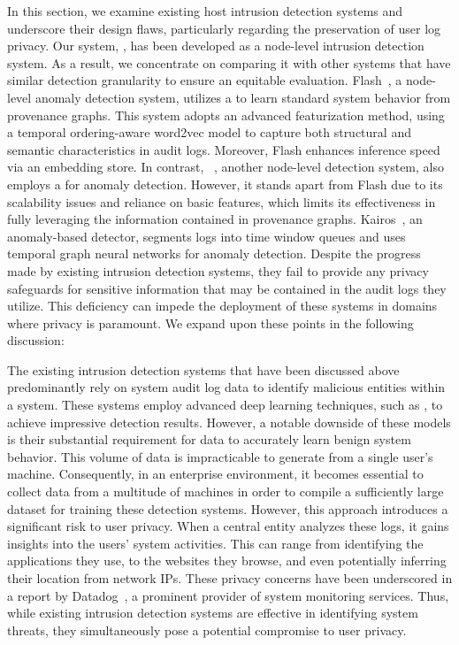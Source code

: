 In this section, we examine existing host intrusion detection systems and underscore their design flaws, particularly regarding the preservation of user log privacy. Our system, \Sys, has been developed as a node-level intrusion detection system. As a result, we concentrate on comparing it with other systems that have similar detection granularity to ensure an equitable evaluation. Flash~\cite{flash2024}, a node-level anomaly detection system, utilizes a \gnn to learn standard system behavior from provenance graphs. This system adopts an advanced featurization method, using a temporal ordering-aware word2vec model to capture both structural and semantic characteristics in audit logs. Moreover, Flash enhances inference speed via an \gnnshort embedding store. In contrast, \threatrace~\cite{wang2022threatrace}, another node-level detection system, also employs a \gnn for anomaly detection. However, it stands apart from Flash due to its scalability issues and reliance on basic features, which limits its effectiveness in fully leveraging the information contained in provenance graphs. Kairos~\cite{cheng2023kairos}, an anomaly-based detector, segments logs into time window queues and uses temporal graph neural networks for anomaly detection. Despite the progress made by existing intrusion detection systems, they fail to provide any privacy safeguards for sensitive information that may be contained in the audit logs they utilize. This deficiency can impede the deployment of these systems in domains where privacy is paramount. We expand upon these points in the following discussion: 

 The existing intrusion detection systems that have been discussed above predominantly rely on system audit log data to identify malicious entities within a system. These systems employ advanced deep learning techniques, such as \gnn, to achieve impressive detection results. However, a notable downside of these models is their substantial requirement for data to accurately learn benign system behavior. This volume of data is impracticable to generate from a single user's machine. Consequently, in an enterprise environment, it becomes essential to collect data from a multitude of machines in order to compile a sufficiently large dataset for training these detection systems. However, this approach introduces a significant risk to user privacy. When a central entity analyzes these logs, it gains insights into the users' system activities. This can range from identifying the applications they use, to the websites they browse, and even potentially inferring their location from network IPs. These privacy concerns have been underscored in a report by Datadog~\cite{datadog}, a prominent provider of system monitoring services. Thus, while existing intrusion detection systems are effective in identifying system threats, they simultaneously pose a potential compromise to user privacy.


